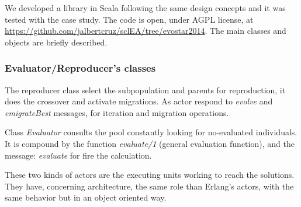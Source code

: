 
We developed a library in Scala following the same design concepts and it was tested with the case study. The code is open, under AGPL license, at \url{https://github.com/jalbertcruz/sclEA/tree/evostar2014}. The main classes and objects are briefly described.


\subsubsection{Evaluator/Reproducer's classes}

The reproducer class select the subpopulation and parents for reproduction, it does the crossover and activate migrations. As actor respond to {\em evolve} and {\em emigrateBest} messages, for iteration and migration operations.


Class {\em Evaluator} consults the pool constantly looking for no-evaluated individuals. It is compound by the function {\em evaluate/1} (general evaluation function), and the message: {\em evaluate} for fire the calculation.

These two kinds of actors are the executing units working to reach the solutions. They have, concerning architecture, the same role than Erlang’s actors, with the same behavior but in an object oriented way.
%
%
%
%
%
%
%
%
%
